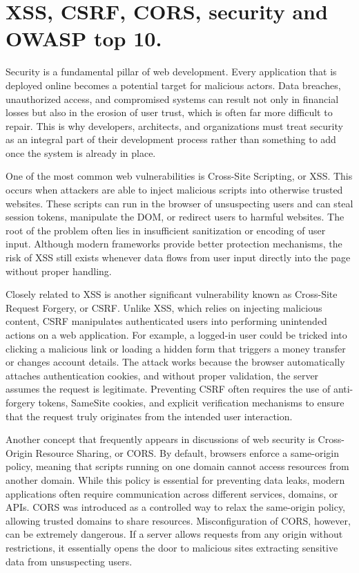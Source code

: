 
\pagebreak

\chapter{XSS, CSRF, CORS, security and OWASP top 10.}


\medskip

Security is a fundamental pillar of web development. Every application that is deployed online becomes a potential target for malicious actors. Data breaches, unauthorized access, and compromised systems can result not only in financial losses but also in the erosion of user trust, which is often far more difficult to repair. This is why developers, architects, and organizations must treat security as an integral part of their development process rather than something to add once the system is already in place.

One of the most common web vulnerabilities is Cross-Site Scripting, or XSS. This occurs when attackers are able to inject malicious scripts into otherwise trusted websites. These scripts can run in the browser of unsuspecting users and can steal session tokens, manipulate the DOM, or redirect users to harmful websites. The root of the problem often lies in insufficient sanitization or encoding of user input. Although modern frameworks provide better protection mechanisms, the risk of XSS still exists whenever data flows from user input directly into the page without proper handling.

Closely related to XSS is another significant vulnerability known as Cross-Site Request Forgery, or CSRF. Unlike XSS, which relies on injecting malicious content, CSRF manipulates authenticated users into performing unintended actions on a web application. For example, a logged-in user could be tricked into clicking a malicious link or loading a hidden form that triggers a money transfer or changes account details. The attack works because the browser automatically attaches authentication cookies, and without proper validation, the server assumes the request is legitimate. Preventing CSRF often requires the use of anti-forgery tokens, SameSite cookies, and explicit verification mechanisms to ensure that the request truly originates from the intended user interaction.

Another concept that frequently appears in discussions of web security is Cross-Origin Resource Sharing, or CORS. By default, browsers enforce a same-origin policy, meaning that scripts running on one domain cannot access resources from another domain. While this policy is essential for preventing data leaks, modern applications often require communication across different services, domains, or APIs. CORS was introduced as a controlled way to relax the same-origin policy, allowing trusted domains to share resources. Misconfiguration of CORS, however, can be extremely dangerous. If a server allows requests from any origin without restrictions, it essentially opens the door to malicious sites extracting sensitive data from unsuspecting users.

